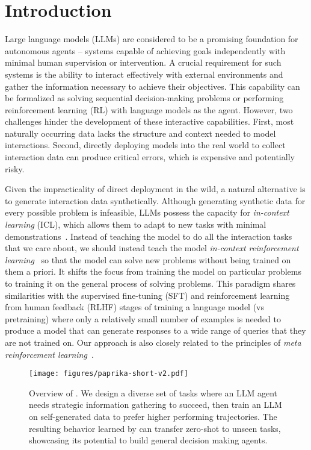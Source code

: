 \section{Introduction}
Large language models (LLMs) are considered to be a promising foundation for autonomous agents -- systems capable of achieving goals independently with minimal human supervision or intervention. A crucial requirement for such systems is the ability to interact effectively with external environments and gather the information necessary to achieve their objectives. This capability can be formalized as solving sequential decision-making problems or performing reinforcement learning (RL) with language models as the agent. However, two challenges hinder the development of these interactive capabilities. First, most naturally occurring data lacks the structure and context needed to model interactions. Second, directly deploying models into the real world to collect interaction data can produce critical errors, which is expensive and potentially risky.

Given the impracticality of direct deployment in the wild, a natural alternative is to generate interaction data synthetically.
Although generating synthetic data for every possible problem is infeasible, LLMs possess the capacity for \emph{in-context learning} (ICL), which allows them to adapt to new tasks with minimal demonstrations~\citep{brown2020language}.
Instead of teaching the model to do all the interaction tasks that we care about, we should instead teach the model \emph{in-context reinforcement learning}~\citep{laskin2022context} so that the model can solve new problems without being trained on them a priori. 
It shifts the focus from training the model on particular problems to training it on the general process of solving problems.
This paradigm shares similarities with the supervised fine-tuning (SFT) and reinforcement learning from human feedback (RLHF) stages of training a language model (vs pretraining) where only a relatively small number of examples is needed to produce a model that can generate responses to a wide range of queries that they are not trained on.
Our approach is also closely related to the principles of \emph{meta reinforcement learning}~\citep{beck2023survey}.

\begin{figure*}[t]
    \centering
    \texttt{[image: figures/paprika-short-v2.pdf]}
    \vspace{-0.3cm}
    \caption{\footnotesize Overview of \ours{}. We design a diverse set of tasks where an LLM agent needs strategic information gathering to succeed, then train an LLM on self-generated data to prefer higher performing trajectories. The resulting behavior learned by \ours{} can transfer zero-shot to unseen tasks, showcasing its potential to build general decision making agents.
    }
    \label{fig:paprika}
    \vspace{-0.2cm}
\end{figure*}

